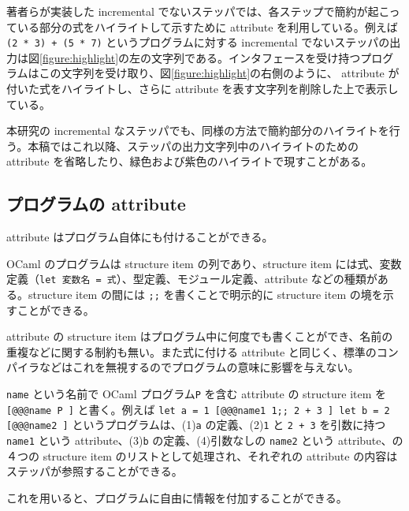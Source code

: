 著者らが実装した incremental でないステッパ\cite{FSA18}では、各ステップで簡約が起こっている部分の式をハイライトして示すために attribute を利用している。例えば \texttt{(2 * 3) + (5 * 7)} というプログラムに対する incremental でないステッパの出力は図\ref{figure:highlight}の左の文字列である。インタフェースを受け持つプログラムはこの文字列を受け取り、図\ref{figure:highlight}の右側のように、 attribute が付いた式をハイライトし、さらに attribute を表す文字列を削除した上で表示している。

本研究の incremental なステッパでも、同様の方法で簡約部分のハイライトを行う。本稿ではこれ以降、ステッパの出力文字列中のハイライトのための attribute を省略したり、緑色および紫色のハイライトで現すことがある。

\subsection{プログラムの attribute}
\label{OCamlのattribute-プログラムのattribute}
attribute はプログラム自体にも付けることができる。

OCaml のプログラムは structure item の列であり、structure item には式、変数定義（\texttt{let 変数名 = 式}）、型定義、モジュール定義、attribute などの種類がある。structure item の間には \texttt{;;} を書くことで明示的に structure item の境を示すことができる。

attribute の structure item はプログラム中に何度でも書くことができ、名前の重複などに関する制約も無い。また式に付ける attribute と同じく、標準のコンパイラなどはこれを無視するのでプログラムの意味に影響を与えない。

\texttt{name} という名前で OCaml プログラム\texttt{P} を含む attribute の structure item を \texttt{[@@@name P ]} と書く。例えば \texttt{let a = 1 [@@@name1 1;; 2 + 3 ] let b = 2 [@@@name2 ]} というプログラムは、(1)\texttt{a} の定義、(2)\texttt{1} と \texttt{2 + 3} を引数に持つ \texttt{name1} という attribute、(3)\texttt{b} の定義、(4)引数なしの \texttt{name2} という attribute、の４つの structure item のリストとして処理され、それぞれの attribute の内容はステッパが参照することができる。

これを用いると、プログラムに自由に情報を付加することができる。
